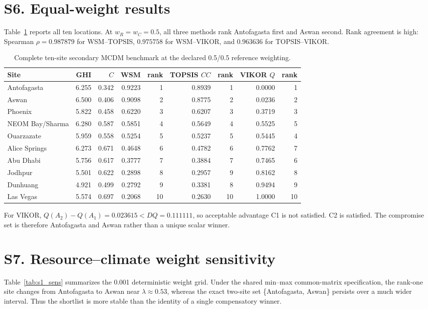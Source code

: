 \documentclass[11pt]{article}
\begin{document}
\section*{S6. Equal-weight results}
Table~\ref{tab:s1_rank} reports all ten locations. At $w_R=w_C=0.5$, all three methods rank Antofagasta first and Aswan second. Rank agreement is high: Spearman $\rho=0.987879$ for WSM--TOPSIS, $0.975758$ for WSM--VIKOR, and $0.963636$ for TOPSIS--VIKOR.

\begin{table}[htbp]
\centering
\caption{Complete ten-site secondary MCDM benchmark at the declared 0.5/0.5 reference weighting.}
\label{tab:s1_rank}
\scriptsize
\begin{tabular}{lrrrrrrrr}
\toprule
Site & GHI & $C$ & WSM & rank & TOPSIS $CC$ & rank & VIKOR $Q$ & rank \\
\midrule
Antofagasta & 6.255 & 0.342 & 0.9223 & 1 & 0.8939 & 1 & 0.0000 & 1 \\
Aswan & 6.500 & 0.406 & 0.9098 & 2 & 0.8775 & 2 & 0.0236 & 2 \\
Phoenix & 5.822 & 0.458 & 0.6220 & 3 & 0.6207 & 3 & 0.3719 & 3 \\
NEOM Bay/Sharma & 6.280 & 0.587 & 0.5851 & 4 & 0.5649 & 4 & 0.5525 & 5 \\
Ouarzazate & 5.959 & 0.558 & 0.5254 & 5 & 0.5237 & 5 & 0.5445 & 4 \\
Alice Springs & 6.273 & 0.671 & 0.4648 & 6 & 0.4782 & 6 & 0.7762 & 7 \\
Abu Dhabi & 5.756 & 0.617 & 0.3777 & 7 & 0.3884 & 7 & 0.7465 & 6 \\
Jodhpur & 5.501 & 0.622 & 0.2898 & 8 & 0.2957 & 9 & 0.8162 & 8 \\
Dunhuang & 4.921 & 0.499 & 0.2792 & 9 & 0.3381 & 8 & 0.9494 & 9 \\
Las Vegas & 5.574 & 0.697 & 0.2068 & 10 & 0.2630 & 10 & 1.0000 & 10 \\
\bottomrule
\end{tabular}
\end{table}

For VIKOR, $Q(A_2)-Q(A_1)=0.023615<DQ=0.111111$, so acceptable advantage C1 is not satisfied. C2 is satisfied. The compromise set is therefore Antofagasta and Aswan rather than a unique scalar winner.

\section*{S7. Resource--climate weight sensitivity}
Table~\ref{tab:s1_sens} summarizes the 0.001 deterministic weight grid. Under the shared min--max common-matrix specification, the rank-one site changes from Antofagasta to Aswan near $\lambda\approx0.53$, whereas the exact two-site set \{Antofagasta, Aswan\} persists over a much wider interval. Thus the shortlist is more stable than the identity of a single compensatory winner.
\end{document}
